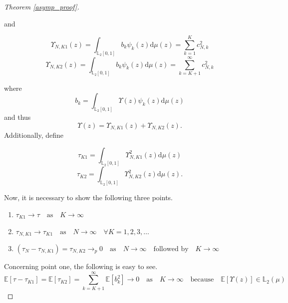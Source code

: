 \documentclass[12pt, a4paper]{article}
\theoremstyle{MAstyle} \newtheorem{assumption}{Assumption}[section]
\theoremstyle{MAstyle} \newtheorem{definition}{Definition}[section]
\theoremstyle{MAstyle} \newtheorem{theorem}{Theorem}[section]
\begin{document}
\begin{proof}[Theorem \ref{asymp_proof}]
\begin{multicols}{2}
		\end{multicols}
		and 
		\begin{multicols}{2}
			\noindent
			\begin{equation*}
				\Upsilon_{N,K1}(z) = \int_{\mathbb{L}_2[0,1]} b_k \psi_k(z) \mathrm{d}\mu(z) = \sum_{k = 1}^{K} c_{N,k}^2
			\end{equation*}
			\begin{equation}
				\Upsilon_{N,K2}(z) = \int_{\mathbb{L}_2[0,1]} b_k \psi_k(z) \mathrm{d}\mu(z) = \sum_{k = K+1}^{\infty} c_{N,k}^2
			\end{equation}
		\end{multicols}
		where
		\begin{equation}
			b_k = \int_{\mathbb{L}_2[0,1]}\Upsilon(z) \psi_k(z) \mathrm{d} \mu(z)
		\end{equation}
		and thus 
		\begin{equation}
			 \Upsilon(z) = \Upsilon_{N,K1}(z) + \Upsilon_{N,K2}(z).
		\end{equation}
		Additionally, define
		\begin{multicols}{2}
			\noindent
			\begin{equation*}
				\tau_{K1} = \int_{\mathbb{L}_2[0,1]} 	\Upsilon_{N,K1}^2(z) \mathrm{d}\mu(z)
			\end{equation*}
			\begin{equation}
				\tau_{K2} = \int_{\mathbb{L}_2[0,1]} 	\Upsilon_{N,K2}^2(z) \mathrm{d}\mu(z).
			\end{equation}
		\end{multicols}
		Now, it is necessary to show the following three points.
		\begin{enumerate}
			\item $\tau_{K1} \rightarrow \tau \quad \text{as} \quad K \rightarrow \infty$
			\item $\tau_{N,K1} \rightarrow \tau_{K1} \quad \text{as} \quad N \rightarrow \infty \quad \forall K = 1,2,3, \dots$
			\item $\left(\tau_N - \tau_{N,K1}\right) = \tau_{N,K2} \rightarrow_p 0 \quad \text{as} \quad N \rightarrow \infty \quad \text{followed by} \quad K \rightarrow \infty$
		\end{enumerate}
	
		Concerning point one, the following is easy to see.
		\begin{equation}
			\mathbb{E}[\tau - \tau_{K1}] = \mathbb{E}[\tau_{K2}] = \sum_{k = K+1}^{\infty} \mathbb{E}[b_k^2] \rightarrow 0 \quad \text{as} \quad K \rightarrow \infty \quad \text{because} \quad \mathbb{E}[\Upsilon(z)] \in \mathbb{L}_2(\mu)
		\end{equation}
	

\end{proof}
\end{document}
